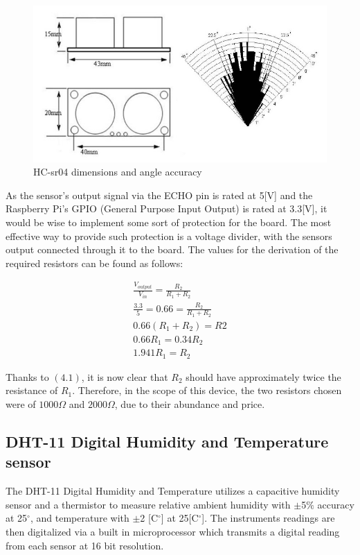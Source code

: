 \documentclass[twoside]{ctuthesis}
\theoremstyle{plain}
\theoremstyle{definition}
\theoremstyle{note}
\begin{document}
\begin{figure}[H]
	\centering
	\includegraphics[scale=0.5]{HCSR04_sizes}
	\caption{HC-sr04 dimensions and angle accuracy \cite{HC-SR04}}
\end{figure}

As the sensor's output signal via the ECHO pin is rated at 5[V] \cite{HC-SR04} and the Raspberry Pi's GPIO (General Purpose Input Output) is rated at 3.3[V]\cite{RasPi0W}, it would be wise to implement some sort of protection for the board. The most effective way to provide such protection is a voltage divider, with the sensors output connected through it to the board. The values for the derivation of the required resistors can be found as follows:

\begin{gather}\nonumber
	\frac{V_{output}}{V_{in}} = \frac{R_2}{R_1 + R_2}\\\nonumber
	\frac{3.3}{5}= 0.66 = \frac{R_2}{R_1 + R_2}\\\nonumber
	0.66(R_1+R_2) = R2\\\nonumber
	0.66R_1 = 0.34R_2\\
	1.941R_1 = R_2
\end{gather}

Thanks to $(4.1)$, it is now clear that $R_2$ should have approximately twice the resistance of $R_1$. Therefore, in the scope of this device, the two resistors chosen were of $1000\Omega$ and $2000\Omega$, due to their abundance and price.


\subsection{DHT-11 Digital Humidity and Temperature sensor}
The DHT-11 Digital Humidity and Temperature utilizes a capacitive humidity sensor and a thermistor to measure relative ambient humidity with $\pm$5$\%$ accuracy at 25$^\circ$, and temperature with $\pm$2 [C$^\circ$] at 25[C$^\circ$]. The instruments readings are then digitalized via a built in microprocessor which transmits a digital reading from each sensor at 16 bit resolution.
\end{document}
